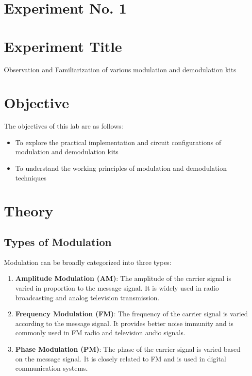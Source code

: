 \documentclass[a4paper,12pt]{article}
\begin{document}
			\section{Experiment No. 1}
		
		\section{Experiment Title }
	Observation and Familiarization of various modulation and demodulation kits
		\section{Objective}
		
		The objectives of this lab are as follows:
		\begin{itemize}
			\item To explore the practical implementation and circuit configurations of modulation and
			demodulation kits
			\item To understand the working principles of modulation and demodulation techniques
			
		\end{itemize}
		
		\section{Theory}
		\subsection{Types of Modulation}
		Modulation can be broadly categorized into three types:
		
		\begin{enumerate}
			\item \textbf{Amplitude Modulation (AM)}: The amplitude of the carrier signal is varied in proportion to the message signal. It is widely used in radio broadcasting and analog television transmission.
			\item \textbf{Frequency Modulation (FM)}: The frequency of the carrier signal is varied according to the message signal. It provides better noise immunity and is commonly used in FM radio and television audio signals.
			\item \textbf{Phase Modulation (PM)}: The phase of the carrier signal is varied based on the message signal. It is closely related to FM and is used in digital communication systems.
		\end{enumerate}
		
\end{document}
